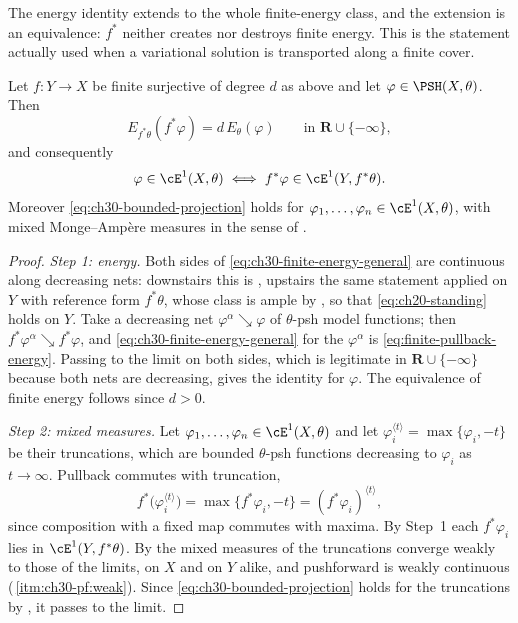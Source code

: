 The energy identity extends to the whole finite-energy class, and the
extension is an equivalence: \(f^*\) neither creates nor destroys finite
energy.  This is the statement actually used when a variational solution is
transported along a finite cover.

\begin{theorem}
\label{thm:ch30-finite-energy-transfer}
Let \(f:Y\to X\) be finite surjective of degree \(d\) as above and let
\(\varphi\in\PSH(X,\theta)\).  Then
\begin{equation}
\label{eq:ch30-finite-energy-general}
 E_{f^*\theta}(f^*\varphi)=d\,E_\theta(\varphi)
 \qquad\text{in }\mathbf R\cup\{-\infty\},
\end{equation}
and consequently
\[
 \varphi\in\cE^1(X,\theta)
 \iff
 f^*\varphi\in\cE^1(Y,f^*\theta).
\]
Moreover \eqref{eq:ch30-bounded-projection} holds for
\(\varphi_1,\ldots,\varphi_n\in\cE^1(X,\theta)\), with mixed
Monge--Amp\`ere measures in the sense of .
\end{theorem}

\begin{proof}
\emph{Step 1: energy.}  Both sides of
\eqref{eq:ch30-finite-energy-general} are continuous along decreasing nets:
downstairs this is , upstairs the same
statement applied on \(Y\) with reference form \(f^*\theta\), whose class is
ample by , so that
\eqref{eq:ch20-standing} holds on \(Y\).  Take a decreasing net
\(\varphi^\alpha\searrow\varphi\) of \(\theta\)-psh model functions; then
\(f^*\varphi^\alpha\searrow f^*\varphi\), and
\eqref{eq:ch30-finite-energy-general} for the \(\varphi^\alpha\) is
\eqref{eq:finite-pullback-energy}.  Passing to the limit on both sides,
which is legitimate in \(\mathbf R\cup\{-\infty\}\) because both nets are
decreasing, gives the identity for \(\varphi\).  The equivalence of finite
energy follows since \(d>0\).

\emph{Step 2: mixed measures.}  Let
\(\varphi_1,\ldots,\varphi_n\in\cE^1(X,\theta)\) and let
\(\varphi_i^{\langle t\rangle}=\max\{\varphi_i,-t\}\) be their truncations,
which are bounded \(\theta\)-psh functions decreasing to \(\varphi_i\) as
\(t\to\infty\).  Pullback commutes with truncation,
\[
 f^*\bigl(\varphi_i^{\langle t\rangle}\bigr)
 =\max\{f^*\varphi_i,-t\}
 =(f^*\varphi_i)^{\langle t\rangle},
\]
since composition with a fixed map commutes with maxima.  By Step~1 each
\(f^*\varphi_i\) lies in \(\cE^1(Y,f^*\theta)\).  By
 the mixed measures of the truncations converge
weakly to those of the limits, on \(X\) and on \(Y\) alike, and pushforward
is weakly continuous
(\,\cref{itm:ch30-pf:weak}).  Since
\eqref{eq:ch30-bounded-projection} holds for the truncations by
, it passes to the limit.
\end{proof}

